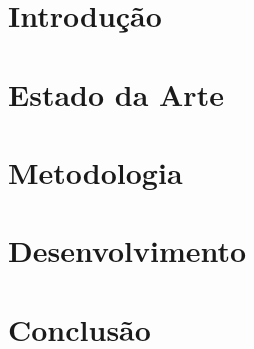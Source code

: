 \documentclass[mestrado, pre-defesa, spanish, english, brazil]{../packages/icmc}
\begin{document}
\textual

\chapter{Introdução}
\label{chapter:introducao}


\chapter{Estado da Arte}
\label{chapter:revisao}


\chapter{Metodologia}
\label{chapter:metodologia}


\chapter{Desenvolvimento}
\label{chapter:desenvolvimento}


\chapter{Conclusão}
\label{chapter:conclusao}


% 

\postextual





\glsaddall
\printglossaries
\end{document}

